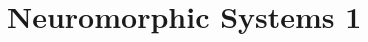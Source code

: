 \documentclass[main]{subfiles}
\begin{document}
\newpage
\section{Neuromorphic Systems 1}
\end{document}
